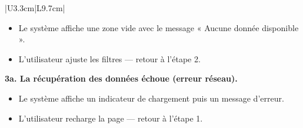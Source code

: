 \documentclass[a4paper,12pt]{report}
\begin{document}
\begin{longtable}{|U{3.3cm}|L{9.7cm}|}
\begin{itemize}
    \item[2.1] Le système affiche une zone vide avec le message
    « Aucune donnée disponible ».
    \item[2.2] L'utilisateur ajuste les filtres — retour à l'étape 2.
\end{itemize}
\textbf{3a. La récupération des données échoue (erreur réseau).}
\begin{itemize}
    \item[3.1] Le système affiche un indicateur de chargement puis un
    message d'erreur.
    \item[3.2] L'utilisateur recharge la page — retour à l'étape 1.
\end{itemize}
\end{longtable}
 
\end{document}
